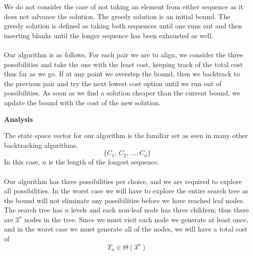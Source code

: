 We do not consider the case of not taking an element from either sequence as it does not advance the solution. 
The greedy solution is an initial bound. The greedy solution is defined as taking both sequences until one runs out and then inserting blanks until the longer sequence has been exhausted as well. 
\\
\\
Our algorithm is as follows. For each pair we are to align, we consider the three possibilities and take the one with the least cost, keeping track of the total cost thus far as we go. If at any point we overstep the bound, then we backtrack to the previous pair and try the next lowest cost option until we run out of possibilities. As soon as we find a solution cheaper than the current bound, we update the bound with the cost of the new solution.
\\
\begin{center}
	{\large \textbf{Analysis}}
\end{center}

The state space vector for our algorithm is the familiar set as seen in many other backtracking algorithms.
$$
	\{ C_1,\,C_2,\,...,C_n \}
$$
In this case, $n$ is the length of the longest sequence.
\\
\\
Our algorithm has three possibilities per choice, and we are required to explore all possibilities. In the worst case we will have to explore the entire search tree as the bound will not eliminate any possibilities before we have reached leaf nodes. The search tree has $n$ levels and each non-leaf node has three children; thus there are $3^n$ nodes in the tree. Since we must visit each node we generate at least once, and in the worst case we must generate all of the nodes, we will have a total cost of
$$
	T_n \in \Theta \left(3^n \right)
$$
